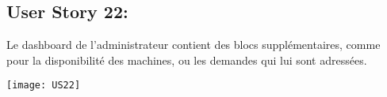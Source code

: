 \newpage{}
\subsection{User Story 22:}
Le dashboard de l'administrateur contient des blocs supplémentaires, comme pour la disponibilité des machines,
ou les demandes qui lui sont adressées.


  \begin{center}
        \texttt{[image: US22]}
  \end{center}